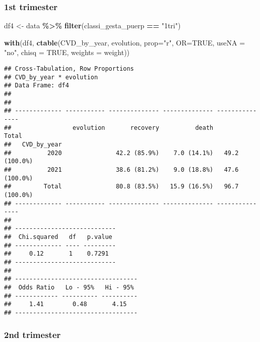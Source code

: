 \documentclass[
]{article}
\newenvironment{Shaded}{\begin{snugshade}}{\end{snugshade}}
\newcommand{\AttributeTok}[1]{\textcolor[rgb]{0.13,0.29,0.53}{#1}}
\newcommand{\ConstantTok}[1]{\textcolor[rgb]{0.56,0.35,0.01}{#1}}
\newcommand{\FunctionTok}[1]{\textcolor[rgb]{0.13,0.29,0.53}{\textbf{#1}}}
\newcommand{\NormalTok}[1]{#1}
\newcommand{\OtherTok}[1]{\textcolor[rgb]{0.56,0.35,0.01}{#1}}
\newcommand{\SpecialCharTok}[1]{\textcolor[rgb]{0.81,0.36,0.00}{\textbf{#1}}}
\newcommand{\StringTok}[1]{\textcolor[rgb]{0.31,0.60,0.02}{#1}}
\begin{document}
\hypertarget{st-trimester-11}{%
\subsubsection{1st trimester}\label{st-trimester-11}}

\begin{Shaded}
\begin{Highlighting}[]
\NormalTok{df4 }\OtherTok{\textless{}{-}}\NormalTok{ data }\SpecialCharTok{\%\textgreater{}\%} 
  \FunctionTok{filter}\NormalTok{(classi\_gesta\_puerp }\SpecialCharTok{==} \StringTok{"1tri"}\NormalTok{)}

\FunctionTok{with}\NormalTok{(df4, }\FunctionTok{ctable}\NormalTok{(CVD\_by\_year, evolution, }\AttributeTok{prop=}\StringTok{"r"}\NormalTok{, }\AttributeTok{OR=}\ConstantTok{TRUE}\NormalTok{, }\AttributeTok{useNA =} \StringTok{"no"}\NormalTok{, }\AttributeTok{chisq =} \ConstantTok{TRUE}\NormalTok{, }\AttributeTok{weights =}\NormalTok{ weight))}
\end{Highlighting}
\end{Shaded}

\begin{verbatim}
## Cross-Tabulation, Row Proportions  
## CVD_by_year * evolution  
## Data Frame: df4  
## 
## 
## ------------- ----------- -------------- -------------- ---------------
##                 evolution       recovery          death           Total
##   CVD_by_year                                                          
##          2020               42.2 (85.9%)    7.0 (14.1%)   49.2 (100.0%)
##          2021               38.6 (81.2%)    9.0 (18.8%)   47.6 (100.0%)
##         Total               80.8 (83.5%)   15.9 (16.5%)   96.7 (100.0%)
## ------------- ----------- -------------- -------------- ---------------
## 
## ----------------------------
##  Chi.squared   df   p.value 
## ------------- ---- ---------
##     0.12       1    0.7291  
## ----------------------------
## 
## ----------------------------------
##  Odds Ratio   Lo - 95%   Hi - 95% 
## ------------ ---------- ----------
##     1.41        0.48       4.15   
## ----------------------------------
\end{verbatim}

\hypertarget{nd-trimester-11}{%
\subsubsection{2nd trimester}\label{nd-trimester-11}}
\end{document}
